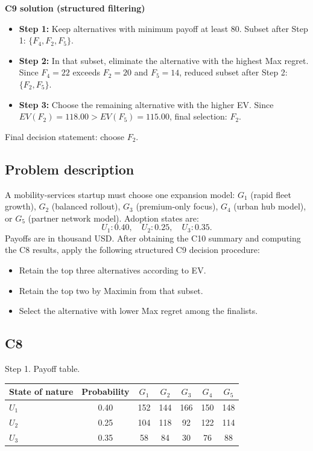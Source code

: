 \begin{ExamProblems}
		\textbf{C9 solution (structured filtering)}
		\begin{itemize}
			\item \textbf{Step 1:} Keep alternatives with minimum payoff at least 80. Subset after Step 1: $\{F_4,F_2,F_5\}$.
			\item \textbf{Step 2:} In that subset, eliminate the alternative with the highest Max regret. Since $F_4=22$ exceeds $F_2=20$ and $F_5=14$, reduced subset after Step 2: $\{F_2,F_5\}$.
			\item \textbf{Step 3:} Choose the remaining alternative with the higher EV. Since $EV(F_2)=118.00>EV(F_5)=115.00$, final selection: $F_2$.
		\end{itemize}
		Final decision statement: choose $F_2$.

		\newpage
		\item
		\subsection*{Problem description}
		A mobility-services startup must choose one expansion model:
		$G_1$ (rapid fleet growth), $G_2$ (balanced rollout), $G_3$ (premium-only focus), $G_4$ (urban hub model), or $G_5$ (partner network model).
		Adoption states are:
		\[
		U_1:0.40,\quad U_2:0.25,\quad U_3:0.35.
		\]
		Payoffs are in thousand USD.
		After obtaining the C10 summary and computing the C8 results, apply the following structured C9 decision procedure:
		\begin{itemize}
			\item Retain the top three alternatives according to EV.
			\item Retain the top two by Maximin from that subset.
			\item Select the alternative with lower Max regret among the finalists.
		\end{itemize}

		\subsection*{C8}
		Step 1. Payoff table.
		\begin{center}
			\begin{tabular}{l c c c c c c}
				\toprule
				State of nature & Probability & $G_1$ & $G_2$ & $G_3$ & $G_4$ & $G_5$ \\
				\midrule
				$U_1$ & 0.40 & 152 & 144 & 166 & 150 & 148 \\
				$U_2$ & 0.25 & 104 & 118 & 92 & 122 & 114 \\
				$U_3$ & 0.35 & 58 & 84 & 30 & 76 & 88 \\
				\bottomrule
			\end{tabular}
		\end{center}


\end{ExamProblems}
